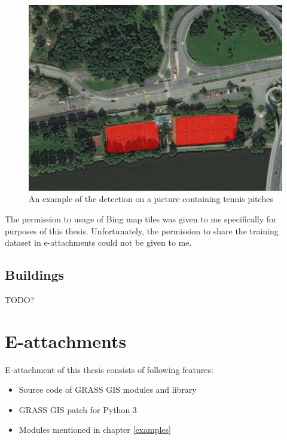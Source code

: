 \begin{figure}[H]
   \centering
	\includegraphics[width=.8\linewidth]{./pictures/out2.png}
	\caption[Detection of tennis pitches]{An example of the detection on a picture containing tennis pitches}
      \label{fig:tennis}
\end{figure}

The permission to usage of Bing map tiles was given to me specifically for 
purposes of this thesis. Unfortunately, the permission to share the training 
dataset in e-attachments could not be given to me.


\section{Buildings}

TODO?

\chapter{E-attachments}
\label{attach}

E-attachment of this thesis consists of following features:

\begin{itemize}
	\item Source code of GRASS GIS modules and library
	\item GRASS GIS patch for Python 3
	\item Modules mentioned in chapter \ref{examples}
\end{itemize}
